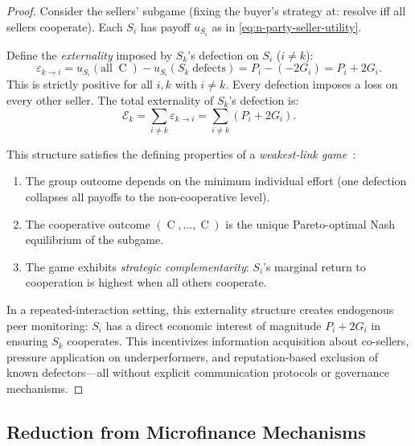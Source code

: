 \documentclass[11pt,a4paper]{article}
\theoremstyle{definition}
\theoremstyle{remark}
\newcommand{\pay}{P}           %
\newcommand{\cumval}{G}        %
\DeclareMathOperator{\Coop}{C}
\begin{document}
\begin{proof}
Consider the sellers' subgame (fixing the buyer's strategy at: resolve
iff all sellers cooperate). Each $S_i$ has payoff
$u_{S_i}$ as in \eqref{eq:n-party-seller-utility}.

Define the \emph{externality} imposed by $S_k$'s defection on $S_i$
($i \neq k$):
\begin{equation}
  \varepsilon_{k \to i}
    = u_{S_i}(\text{all}\;\Coop) - u_{S_i}(S_k\;\text{defects})
    = \pay_i - (-2\cumval_i)
    = \pay_i + 2\cumval_i.
\end{equation}
This is strictly positive for all $i, k$ with $i \neq k$. Every
defection imposes a loss on every other seller. The total externality
of $S_k$'s defection is:
\begin{equation}
  \mathcal{E}_k = \sum_{i \neq k} \varepsilon_{k \to i}
    = \sum_{i \neq k} (\pay_i + 2\cumval_i).
\end{equation}

This structure satisfies the defining properties of a \emph{weakest-link
game}~\citep{hirshleifer1983}:
\begin{enumerate}
  \item The group outcome depends on the minimum individual effort
    (one defection collapses all payoffs to the non-cooperative level).
  \item The cooperative outcome $(\Coop, \ldots, \Coop)$ is the unique
    Pareto-optimal Nash equilibrium of the subgame.
  \item The game exhibits \emph{strategic complementarity}: $S_i$'s
    marginal return to cooperation is highest when all others cooperate.
\end{enumerate}

In a repeated-interaction setting, this externality structure creates
endogenous peer monitoring: $S_i$ has a direct economic interest of
magnitude $\pay_i + 2\cumval_i$ in ensuring $S_k$ cooperates. This
incentivizes information acquisition about co-sellers, pressure
application on underperformers, and reputation-based exclusion of known
defectors---all without explicit communication protocols or governance
mechanisms.
\end{proof}

\subsection{Reduction from Microfinance Mechanisms}
\label{sec:microfinance-reduction}
\end{document}
